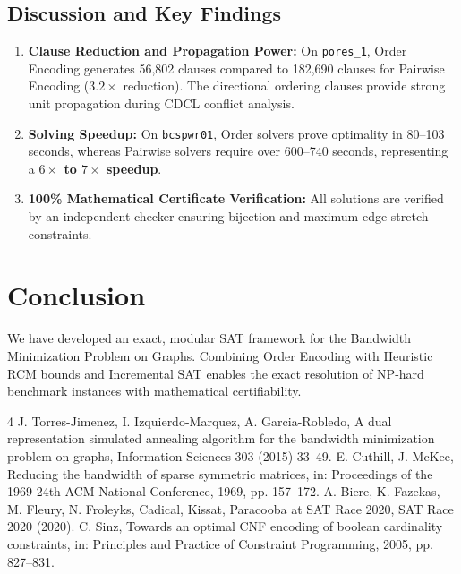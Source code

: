 \documentclass[a4paper,fleqn]{cas-sc}
\begin{document}
\subsection{Discussion and Key Findings}
\begin{enumerate}
    \item \textbf{Clause Reduction and Propagation Power:} On \texttt{pores\_1}, Order Encoding generates 56,802 clauses compared to 182,690 clauses for Pairwise Encoding ($3.2\times$ reduction). The directional ordering clauses provide strong unit propagation during CDCL conflict analysis.
    \item \textbf{Solving Speedup:} On \texttt{bcspwr01}, Order solvers prove optimality in 80--103 seconds, whereas Pairwise solvers require over 600--740 seconds, representing a \textbf{$6\times$ to $7\times$ speedup}.
    \item \textbf{100\% Mathematical Certificate Verification:} All solutions are verified by an independent checker ensuring bijection and maximum edge stretch constraints.
\end{enumerate}

\section{Conclusion}
We have developed an exact, modular SAT framework for the Bandwidth Minimization Problem on Graphs. Combining Order Encoding with Heuristic RCM bounds and Incremental SAT enables the exact resolution of NP-hard benchmark instances with mathematical certifiability.


\begin{thebibliography}{4}
 J. Torres-Jimenez, I. Izquierdo-Marquez, A. Garcia-Robledo, A dual representation simulated annealing algorithm for the bandwidth minimization problem on graphs, Information Sciences 303 (2015) 33--49.
 E. Cuthill, J. McKee, Reducing the bandwidth of sparse symmetric matrices, in: Proceedings of the 1969 24th ACM National Conference, 1969, pp. 157--172.
 A. Biere, K. Fazekas, M. Fleury, N. Froleyks, Cadical, Kissat, Paracooba at SAT Race 2020, SAT Race 2020 (2020).
 C. Sinz, Towards an optimal CNF encoding of boolean cardinality constraints, in: Principles and Practice of Constraint Programming, 2005, pp. 827--831.
\end{thebibliography}
\end{document}
